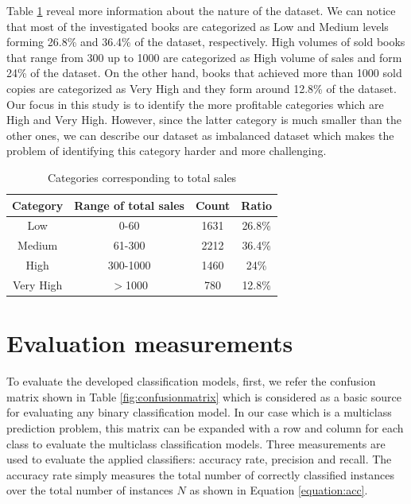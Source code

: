 \documentclass[a4paper,10pt,onecolumn,preprint,3p]{elsarticle}
\begin{document}
Table \ref{table:freq} reveal more information about the nature of the dataset. We can notice that most of the investigated books are categorized as Low and Medium levels forming 26.8\% and 36.4\% of the dataset, respectively. High volumes of sold books that range from 300 up to 1000 are categorized as High volume of sales and form 24\% of the dataset. On the other hand, books that achieved more than 1000 sold copies are categorized as Very High and they form around 12.8\% of the dataset. Our focus in this study is to identify the more profitable categories which are High and Very High. However, since the latter category is much smaller than the other ones, we can describe our dataset as imbalanced dataset which makes the problem of identifying this category harder and more challenging.





\begin{table}[ht]
\caption{Categories corresponding to total sales }
\centering{}%
\begin{tabular}{|c|c|c|c|}
\hline 
Category & Range of total sales & Count & Ratio\tabularnewline
\hline 
\hline 
Low & 0-60 & 1631 & 26.8\%\tabularnewline
\hline 
Medium & 61-300 & 2212 & 36.4\%\tabularnewline
\hline 
High & 300-1000 & 1460 & 24\%\tabularnewline
\hline 
Very High & $>$1000 & 780 & 12.8\%\tabularnewline
\hline 
\end{tabular}
\label{table:freq}
\end{table}


\section{Evaluation measurements}
\label{sec:eval_measures}

To evaluate the developed classification models, first, we refer the confusion matrix shown in Table \ref{fig:confusionmatrix} which is considered as a basic source for evaluating any binary classification model. In our case which is a multiclass prediction problem, this matrix can be expanded with a row and column for each class to evaluate the multiclass classification models. Three measurements are used to evaluate the applied classifiers: accuracy rate, precision and recall. The accuracy rate simply measures the total number of correctly classified instances over the total number of instances $N$ as shown in Equation \ref{equation:acc}.
\end{document}
